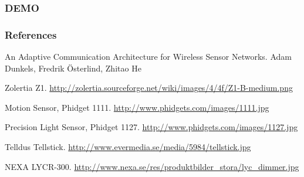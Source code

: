 \documentclass{beamer}
\begin{document}
\begin{frame}
\frametitle{DEMO}
	
\end{frame}

\begin{frame}
\frametitle{References}

\begin{thebibliography}{10} 

An Adaptive Communication Architecture for Wireless Sensor Networks.
\newblock Adam Dunkels, Fredrik Österlind, Zhitao He

Zolertia Z1.
\newblock \url{http://zolertia.sourceforge.net/wiki/images/4/4f/Z1-B-medium.png}

Motion Sensor, Phidget 1111.
\newblock \url{http://www.phidgets.com/images/1111.jpg}

Precision Light Sensor, Phidget 1127.
\newblock \url{http://www.phidgets.com/images/1127.jpg}

Telldus Tellstick.
\newblock \url{http://www.evermedia.se/media/5984/tellstick.jpg}

NEXA LYCR-300.
\newblock \url{http://www.nexa.se/res/produktbilder_stora/lyc_dimmer.jpg}

\end{thebibliography}

\end{frame}
\end{document}
